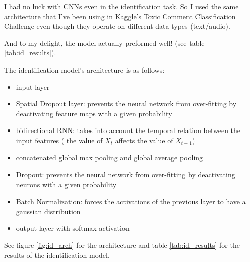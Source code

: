 \documentclass{article}
\begin{document}
I had no luck with CNNs even in the identification task. So I used the same architecture that I've been using in Kaggle's Toxic Comment Classification Challenge even though they operate on different data types (text/audio).

And to my delight, the model actually preformed well! (see table \ref{tab:id_results}).

The identification model's architecture is as follows:
\begin{itemize}
    \item input layer 
    \item Spatial Dropout layer: prevents the neural network from over-fitting by deactivating feature maps with a given probability
    \item bidirectional RNN: takes into account the temporal relation between the input features ( the value of $X_t$ affects the value of $X_{t+1}$)
    \item concatenated global max pooling and global average pooling
    \item Dropout:  prevents the neural network from over-fitting by deactivating neurons with a given probability
    \item Batch Normalization: forces the activations of the previous layer to have a gaussian distribution  \cite{chollet2015keras}
    \item output layer with softmax activation
\end{itemize}
See figure \ref{fig:id_arch} for the architecture and table \ref{tab:id_results} for the results of the identification model.
\end{document}
